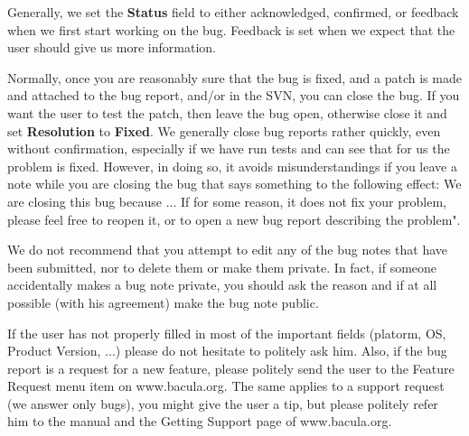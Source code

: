 Generally, we set the {\bf Status} field to either acknowledged, confirmed,
or feedback when we first start working on the bug.  Feedback is set when
we expect that the user should give us more information.

Normally, once you are reasonably sure that the bug is fixed, and a patch
is made and attached to the bug report, and/or in the SVN, you can close
the bug.  If you want the user to test the patch, then leave the bug open,
otherwise close it and set {\bf Resolution} to {\bf Fixed}.  We generally
close bug reports rather quickly, even without confirmation, especially if
we have run tests and can see that for us the problem is fixed.  However,
in doing so, it avoids misunderstandings if you leave a note while you are
closing the bug that says something to the following effect:
We are closing this bug because ...   If for some reason, it does not fix
your problem, please feel free to reopen it, or to open a new bug report
describing the problem".

We do not recommend that you attempt to edit any of the bug notes that have
been submitted, nor to delete them or make them private.  In fact, if
someone accidentally makes a bug note private, you should ask the reason
and if at all possible (with his agreement) make the bug note public.

If the user has not properly filled in most of the important fields
(platorm, OS, Product Version, ...) please do not hesitate to politely ask
him.  Also, if the bug report is a request for a new feature, please
politely send the user to the Feature Request menu item on www.bacula.org.
The same applies to a support request (we answer only bugs), you might give
the user a tip, but please politely refer him to the manual and the
Getting Support page of www.bacula.org.
